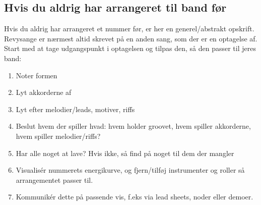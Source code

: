 \subsection{Hvis du aldrig har arrangeret til band før}
Hvis du aldrig har arrangeret et nummer før, er her en generel/abstrakt opskrift. Revysange er nærmest altid skrevet på en anden sang, som der er en optagelse af. Start med at tage udgangspunkt i optagelsen og tilpas den, så den passer til jeres band:
\begin{enumerate}
    \item Noter formen
    \item Lyt akkorderne af
    \item Lyt efter melodier/leads, motiver, riffs
    \item Beslut hvem der spiller hvad: hvem holder groovet, hvem spiller akkorderne, hvem spiller melodier/riffs?
    \item Har alle noget at lave? Hvis ikke, så find på noget til dem der mangler
    \item Visualisér nummerets energikurve, og fjern/tilføj instrumenter og roller så arrangementet passer til.
    \item Kommunikér dette på passende vis, f.eks via lead sheets, noder eller demoer.
\end{enumerate}